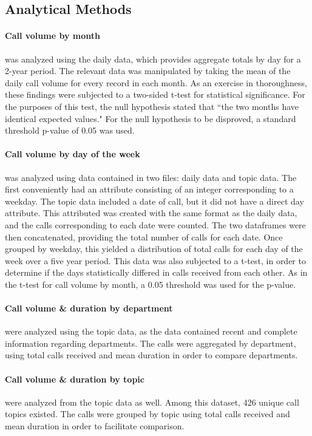 \documentclass[12pt]{article}
\begin{document}
	\subsection{Analytical Methods}
	
\paragraph{Call volume by month} was analyzed using the daily data, which provides aggregate totals by day for a 2-year period. The relevant data was manipulated by taking the mean of the daily call volume for every record in each month.  As an exercise in thoroughness, these findings were subjected to a two-sided t-test for statistical significance.  For the purposes of this test, the null hypothesis stated that “the two months have identical expected values."  For the null hypothesis to be disproved, a standard threshold p-value of 0.05 was used.

\paragraph{Call volume by day of the week} was analyzed using data contained in two files: daily data and topic data.  The first conveniently had an attribute consisting of an integer corresponding to a weekday.  The topic data included a date of call, but it did not have a direct day attribute.  This attributed was created with the same format as the daily data, and the calls corresponding to each date were counted.  The two dataframes were then concatenated, providing the total number of calls for each date.  Once grouped by weekday, this yielded a distribution of total calls for each day of the week over a five year period.  This data was also subjected to a t-test, in order to determine if the days statistically differed in calls received from each other.  As in the t-test for call volume by month, a 0.05 threshold was used for the p-value.

\paragraph{Call volume \& duration by department} were analyzed using the topic data, as the data contained recent and complete information regarding departments.  The calls were aggregated by department, using total calls received and mean duration in order to compare departments.

\paragraph{Call volume \& duration by topic} were analyzed from the topic data as well.  Among this dataset, 426 unique call topics existed.  The calls were grouped by topic using total calls received and mean duration in order to facilitate comparison.
\end{document}
